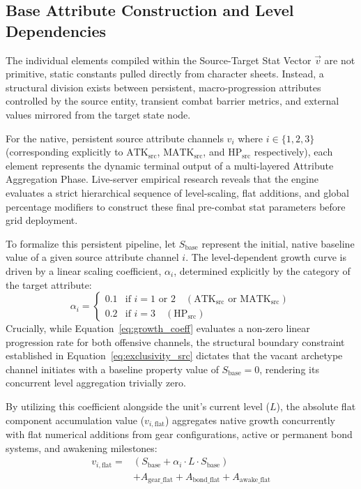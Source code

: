 \documentclass[twocolumn,10pt]{article}
\begin{document}
\subsection{Base Attribute Construction and Level Dependencies}
The individual elements compiled within the Source-Target Stat Vector $\vec{v}$ are not primitive, static constants pulled directly from character sheets. Instead, a structural division exists between persistent, macro-progression attributes controlled by the source entity, transient combat barrier metrics, and external values mirrored from the target state node. 

For the native, persistent source attribute channels $v_i$ where $i \in \{1, 2, 3\}$ (corresponding explicitly to $\text{ATK}_{\text{src}}$, $\text{MATK}_{\text{src}}$, and $\text{HP}_{\text{src}}$ respectively), each element represents the dynamic terminal output of a multi-layered Attribute Aggregation Phase. Live-server empirical research reveals that the engine evaluates a strict hierarchical sequence of level-scaling, flat additions, and global percentage modifiers to construct these final pre-combat stat parameters before grid deployment.

To formalize this persistent pipeline, let $S_{\text{base}}$ represent the initial, native baseline value of a given source attribute channel $i$. The level-dependent growth curve is driven by a linear scaling coefficient, $\alpha_i$, determined explicitly by the category of the target attribute:
\begin{equation}
\alpha_i = 
\begin{cases} 
0.1 & \text{if } i = 1 \text{ or } 2 \quad (\text{ATK}_{\text{src}} \text{ or } \text{MATK}_{\text{src}}) \\ 
0.2 & \text{if } i = 3 \quad (\text{HP}_{\text{src}}) 
\end{cases}
\label{eq:growth_coeff}
\end{equation}
Crucially, while Equation~\ref{eq:growth_coeff} evaluates a non-zero linear progression rate for both offensive channels, the structural boundary constraint established in Equation~\ref{eq:exclusivity_src} dictates that the vacant archetype channel initiates with a baseline property value of $S_{\text{base}} = 0$, rendering its concurrent level aggregation trivially zero.

By utilizing this coefficient alongside the unit's current level ($L$), the absolute flat component accumulation value ($v_{i,\text{flat}}$) aggregates native growth concurrently with flat numerical additions from gear configurations, active or permanent bond systems, and awakening milestones:
\begin{equation}
\begin{split}
v_{i,\text{flat}} = {} & \left( S_{\text{base}} + \alpha_i \cdot L \cdot S_{\text{base}} \right) \\
& + A_{\text{gear\_flat}} + A_{\text{bond\_flat}} + A_{\text{awake\_flat}}
\end{split}
\label{eq:flat_stat_construction}
\end{equation}
\end{document}

